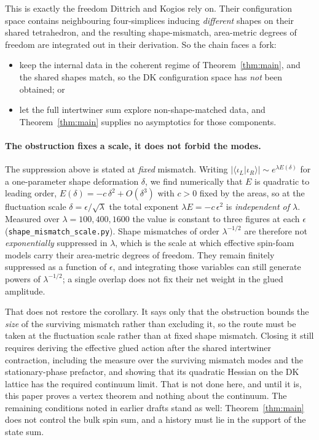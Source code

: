 \documentclass[11pt]{article}
\numberwithin{equation}{section}
\theoremstyle{definition}
\theoremstyle{remark}
\begin{document}
This is exactly the freedom Dittrich and Kogios rely on. Their configuration
space contains neighbouring four-simplices inducing \emph{different} shapes on
their shared tetrahedron, and the resulting shape-mismatch, area-metric degrees of
freedom are integrated out in their derivation. So the chain faces a fork:

\begin{itemize}
\item keep the internal data in the coherent regime of Theorem~\ref{thm:main},
and the shared shapes match, so the DK configuration space has \emph{not} been
obtained; or
\item let the full intertwiner sum explore non-shape-matched data, and
Theorem~\ref{thm:main} supplies no asymptotics for those components.
\end{itemize}

\paragraph{The obstruction fixes a scale, it does not forbid the modes.}
The suppression above is stated at \emph{fixed} mismatch. Writing
$|\langle\iota_L|\iota_R\rangle|\sim e^{\lambda E(\delta)}$ for a one-parameter
shape deformation $\delta$, we find numerically that $E$ is quadratic to leading order,
$E(\delta)=-c\,\delta^2+O(\delta^3)$ with $c>0$ fixed by the areas, so at the
fluctuation scale
$\delta=\epsilon/\sqrt\lambda$ the total exponent $\lambda E=-c\,\epsilon^2$ is
\emph{independent of $\lambda$}. Measured over $\lambda=100,400,1600$ the value
is constant to three figures at each $\epsilon$
(\texttt{shape\_mismatch\_scale.py}). Shape mismatches of order $\lambda^{-1/2}$
are therefore not \emph{exponentially} suppressed in $\lambda$, which is the scale
at which effective spin-foam models carry their area-metric degrees of freedom.
They remain finitely suppressed as a function of $\epsilon$, and integrating those
variables can still generate powers of $\lambda^{-1/2}$; a single overlap does not
fix their net weight in the glued amplitude.

That does not restore the corollary. It says only that the obstruction bounds the
\emph{size} of the surviving mismatch rather than excluding it, so the route must
be taken at the fluctuation scale rather than at fixed shape mismatch. Closing it
still requires deriving the effective glued action after the shared intertwiner
contraction, including the measure over the surviving mismatch modes and the
stationary-phase prefactor, and showing that its quadratic Hessian on the DK
lattice has the required continuum limit. That is not done here, and until it is,
this paper proves a vertex theorem and nothing about the continuum. The remaining
conditions noted in earlier drafts stand as well: Theorem~\ref{thm:main} does not
control the bulk spin sum, and a history must lie in the support of the state
sum.
\end{document}
